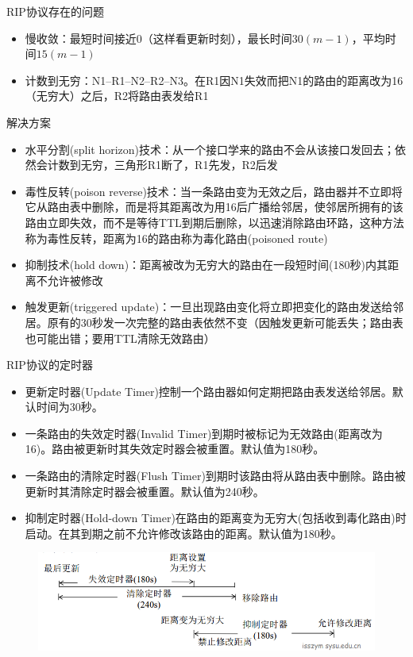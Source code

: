 \myhline
RIP协议存在的问题
\begin{itemize}
	\item 慢收敛：最短时间接近$0$（这样看更新时刻），最长时间$30(m-1)$，平均时间$15(m-1)$
	\item 计数到无穷：N1--R1--N2--R2--N3。在R1因N1失效而把N1的路由的距离改为16（无穷大）之后，R2将路由表发给R1
\end{itemize}

解决方案
\begin{itemize}
	\item 水平分割(split horizon)技术：从一个接口学来的路由不会从该接口发回去；依然会计数到无穷，三角形R1断了，R1先发，R2后发
	\item 毒性反转(poison reverse)技术：当一条路由变为无效之后，路由器并不立即将它从路由表中删除，而是将其距离改为用16后广播给邻居，使邻居所拥有的该路由立即失效，而不是等待TTL到期后删除，以迅速消除路由环路，这种方法称为毒性反转，距离为16的路由称为毒化路由(poisoned route)
	\item 抑制技术(hold down)：距离被改为无穷大的路由在一段短时间(180秒)内其距离不允许被修改
	\item 触发更新(triggered update)：一旦出现路由变化将立即把变化的路由发送给邻居。原有的30秒发一次完整的路由表依然不变（因触发更新可能丢失；路由表也可能出错；要用TTL清除无效路由）
\end{itemize}

\myhline
RIP协议的定时器
\begin{itemize}
\item 更新定时器(Update Timer)控制一个路由器如何定期把路由表发送给邻居。默认时间为30秒。
\item 一条路由的失效定时器(Invalid Timer)到期时被标记为无效路由(距离改为16)。路由被更新时其失效定时器会被重置。默认值为180秒。
\item 一条路由的清除定时器(Flush Timer)到期时该路由将从路由表中删除。路由被更新时其清除定时器会被重置。默认值为240秒。
\item 抑制定时器(Hold-down Timer)在路由的距离变为无穷大(包括收到毒化路由)时启动。在其到期之前不允许修改该路由的距离。默认值为180秒。
\end{itemize}
\begin{figure}[H]
	\centering
	\includegraphics[width=0.7\linewidth]{fig/rip_timer.png}
\end{figure}

